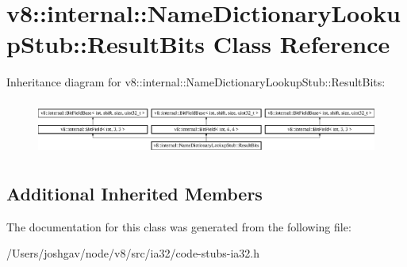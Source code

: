 \hypertarget{classv8_1_1internal_1_1_name_dictionary_lookup_stub_1_1_result_bits}{}\section{v8\+:\+:internal\+:\+:Name\+Dictionary\+Lookup\+Stub\+:\+:Result\+Bits Class Reference}
\label{classv8_1_1internal_1_1_name_dictionary_lookup_stub_1_1_result_bits}
Inheritance diagram for v8\+:\+:internal\+:\+:Name\+Dictionary\+Lookup\+Stub\+:\+:Result\+Bits\+:\begin{figure}[H]
\begin{center}
\leavevmode
\includegraphics[height=1.800643cm]{classv8_1_1internal_1_1_name_dictionary_lookup_stub_1_1_result_bits}
\end{center}
\end{figure}
\subsection*{Additional Inherited Members}


The documentation for this class was generated from the following file\+:\begin{DoxyCompactItemize}
\item 
/\+Users/joshgav/node/v8/src/ia32/code-\/stubs-\/ia32.\+h\end{DoxyCompactItemize}
